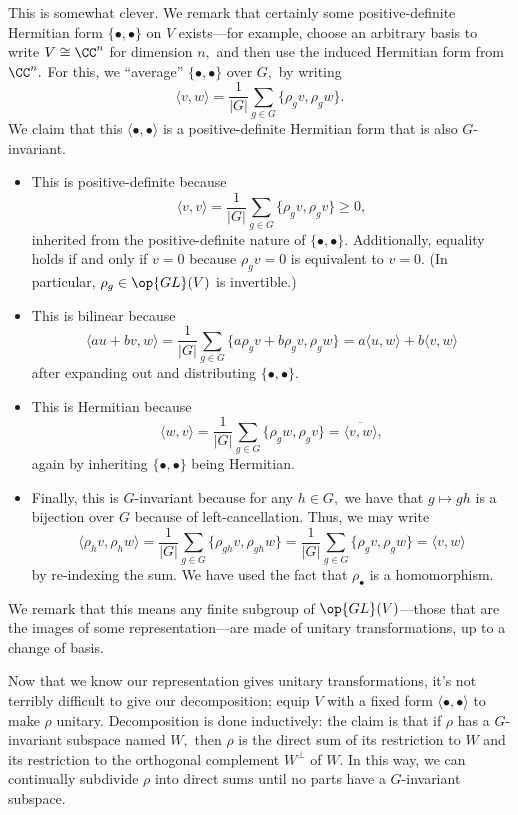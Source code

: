 This is somewhat clever. We remark that certainly some positive-definite Hermitian form $\{\bullet,\bullet\}$ on $V$ exists---for example, choose an arbitrary basis to write $V\cong\CC^n$ for dimension $n,$ and then use the induced Hermitian form from $\CC^n.$ For this, we ``average'' $\{\bullet,\bullet\}$ over $G,$ by writing
\[\langle v,w\rangle=\frac1{|G|}\sum_{g\in G}\{\rho_gv,\rho_gw\}.\]
We claim that this $\langle\bullet,\bullet\rangle$ is a positive-definite Hermitian form that is also $G$-invariant.
\begin{itemize}
    \item This is positive-definite because
    \[\langle v,v\rangle=\frac1{|G|}\sum_{g\in G}\{\rho_gv,\rho_gv\}\ge0,\]
    inherited from the positive-definite nature of $\{\bullet,\bullet\}.$ Additionally, equality holds if and only if $v=0$ because $\rho_gv=0$ is equivalent to $v=0.$ (In particular, $\rho_g\in\op{GL}(V)$ is invertible.)
    \item This is bilinear because
    \[\langle au+bv,w\rangle=\frac1{|G|}\sum_{g\in G}\{a\rho_gv+b\rho_gv,\rho_gw\}=a\langle u,w\rangle+b\langle v,w\rangle\]
    after expanding out and distributing $\{\bullet,\bullet\}.$
    \item This is Hermitian because
    \[\langle w,v\rangle=\frac1{|G|}\sum_{g\in G}\{\rho_gw,\rho_gv\}=\overline{\langle v,w\rangle},\]
    again by inheriting $\{\bullet,\bullet\}$ being Hermitian.
    \item Finally, this is $G$-invariant because for any $h\in G,$ we have that $g\mapsto gh$ is a bijection over $G$ because of left-cancellation. Thus, we may write
    \[\langle\rho_hv,\rho_hw\rangle=\frac1{|G|}\sum_{g\in G}\{\rho_{gh}v,\rho_{gh}w\}=\frac1{|G|}\sum_{g\in G}\{\rho_gv,\rho_gw\}=\langle v,w\rangle\]
    by re-indexing the sum. We have used the fact that $\rho_\bullet$ is a homomorphism.
\end{itemize}
We remark that this means any finite subgroup of $\op{GL}(V)$---those that are the images of some representation---are made of unitary transformations, up to a change of basis.

Now that we know our representation gives unitary transformations, it's not terribly difficult to give our decomposition; equip $V$ with a fixed form $\langle\bullet,\bullet\rangle$ to make $\rho$ unitary. Decomposition is done inductively: the claim is that if $\rho$ has a $G$-invariant subspace named $W,$ then $\rho$ is the direct sum of its restriction to $W$ and its restriction to the orthogonal complement $W^\perp$ of $W.$ In this way, we can continually subdivide $\rho$ into direct sums until no parts have a $G$-invariant subspace.

